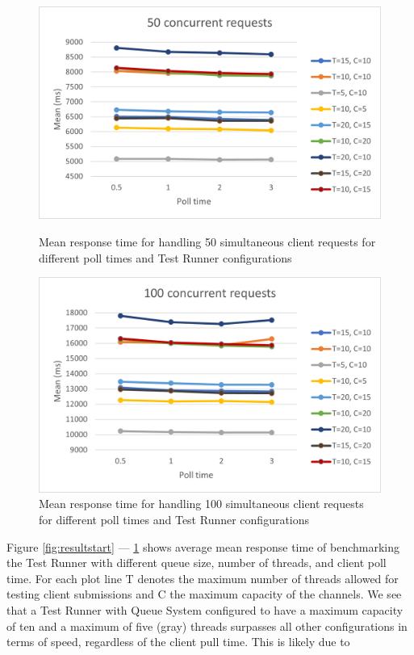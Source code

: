 \begin{figure}[!tbp]
\begin{minipage}[t]{0.4\textwidth}
    \centering
    \includegraphics[scale=0.65]{images/50.png}
    \caption{Mean response time for handling 50 simultaneous client requests for different poll times and Test Runner configurations}
  \end{minipage}
  \hfill
  \begin{minipage}[t]{0.4\textwidth}
    \centering
    \includegraphics[scale=0.65]{images/100.png}
    \caption{Mean response time for handling 100 simultaneous client requests for different poll times and Test Runner configurations}
    \label{fig:resultEnd}

  \end{minipage}
\end{figure}

Figure \ref{fig:resultstart} --- \ref{fig:resultEnd} shows average mean response time of benchmarking the Test Runner with different queue size, number of threads, and client poll time. For each plot line T denotes the maximum number of threads allowed for testing client submissions and C the maximum capacity of the channels.
We see that a Test Runner with Queue System configured to have a maximum capacity of ten and a maximum of five (gray) threads surpasses all other configurations in terms of speed, regardless of the client pull time. 
This is likely due to 


